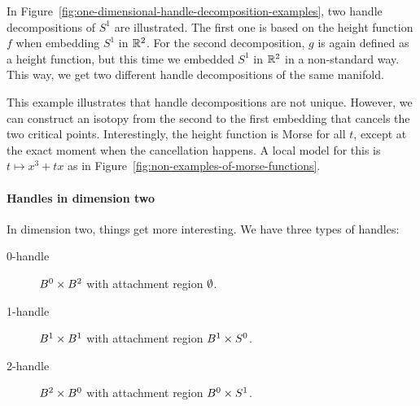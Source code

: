 \begin{eg}
    In Figure~\ref{fig:one-dimensional-handle-decomposition-examples}, two handle decompositions of $S^{1}$ are illustrated.
    The first one is based on the height function $f$ when embedding $S^{1}$ in $\mathbb{R}^2$.
    For the second decomposition, $g$ is again defined as a height function, but this time we embedded $S^{1}$ in $ \mathbb{R}^2$ in a non-standard way.
    This way, we get two different handle decompositions of the same manifold.
\end{eg}
\begin{figure}[H]
    \centering
\end{figure}
This example illustrates that handle decompositions are not unique.
However, we can construct an isotopy from the second to the first embedding that cancels the two critical points.
Interestingly, the height function is Morse for all $t$, except at the exact moment when the cancellation happens.
A local model for this is $t\mapsto x^3 + tx$ as in Figure~\ref{fig:non-examples-of-morse-functions}.
\begin{figure}[H]
    \centering
\end{figure}


\paragraph{Handles in dimension two}
In dimension two, things get more interesting.
We have three types of handles:

\begin{description}
    \item[0-handle] $B^{0} \times B^{2}$ with attachment region $\emptyset$. \hfill {}
    \item[1-handle] $B^{1} \times B^{1}$ with attachment region $B^{1} \times S^{0}$. \hfill{}
    \item[2-handle] $B^{2} \times B^{0}$ with attachment region $B^{0} \times S^1$. \hfill{}
\end{description}

